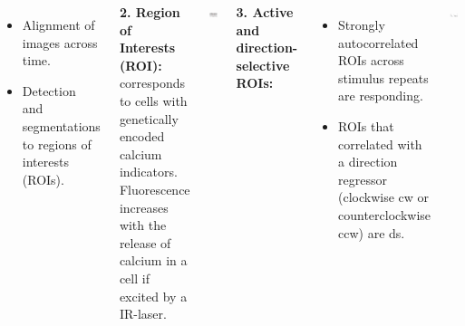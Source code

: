 \documentclass[25pt, a0paper, portrait, margin=0mm, innermargin=20mm,
blockverticalspace=2mm, colspace=20mm, subcolspace=0mm]{tikzposter} %
\begin{document}
\begin{columns}
{    \begin{itemize}
        \item Alignment of images across time.
        \item Detection and segmentations to regions of interests (ROIs).
    \end{itemize}

    \textbf{2. Region of Interests (ROI):}
    corresponds to cells with genetically encoded calcium indicators. 
    Fluorescence increases with the release of calcium in a cell if excited by a IR-laser.
    
    
    \vspace{0.5cm}
    \begin{tikzfigure}[]
        \label{Raw}
        \includegraphics[width=22cm]{figs/autocorrelation.pdf}
    \end{tikzfigure} 
    \vspace{0.6cm}
    \textbf{3. Active and direction-selective ROIs:} 
    \begin{itemize}
        \item Strongly autocorrelated ROIs across stimulus repeats are \glqq responding\grqq{}.
        \item ROIs that correlated with a direction regressor (clockwise cw or counterclockwise ccw) are ds.
    \end{itemize}
    \begin{tikzfigure}[]
        \label{Rois}
        \includegraphics[width=22cm]{figs/pcorrelation.pdf} 
    \end{tikzfigure}
    \vspace{0.5}
    
}
\end{columns}
\end{document}
